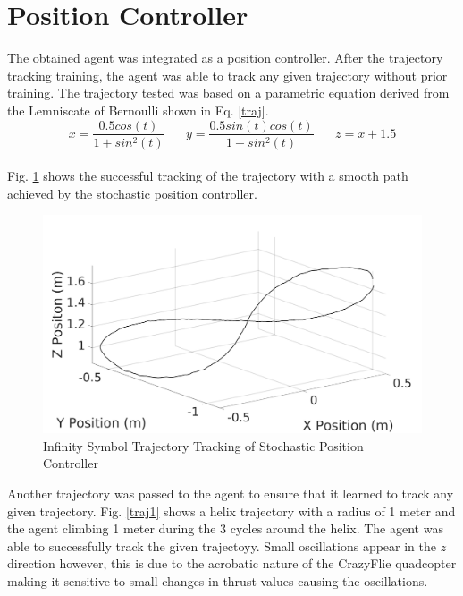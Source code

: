     \section{Position Controller}
    The obtained agent was integrated as a position controller. After the trajectory tracking training, the agent was able to track any given trajectory without prior training. The trajectory tested was based on a parametric equation derived from the Lemniscate of Bernoulli shown in Eq. \ref{traj}.\\
    \begin{equation}
    x = \frac{0.5 cos(t)}{1 + sin^2(t)}\hspace{20pt} y = \frac{0.5 sin(t) cos(t)}{1 + sin^2(t)} \hspace{20pt} z = x + 1.5
        \label{traj}
    \end{equation}\\
    Fig. \ref{traj2} shows the successful tracking of the trajectory with a smooth path achieved by the stochastic position controller.
    \begin{figure}[H]
            \centering
            \includegraphics[width=1\textwidth]{plots/traj2.jpg}
            \caption{Infinity Symbol Trajectory Tracking of Stochastic Position Controller}
            \label{traj2}
    \end{figure}\clearpage
    Another trajectory was passed to the agent to ensure that it learned to track any given trajectory. Fig. \ref{traj1} shows a helix trajectory with a radius of 1 meter and the agent climbing 1 meter during the 3 cycles around the helix. The agent was able to successfully track the given trajectoyy. Small oscillations appear in the $z$ direction however, this is due to the acrobatic nature of the CrazyFlie quadcopter making it sensitive to small changes in thrust values causing the oscillations.
